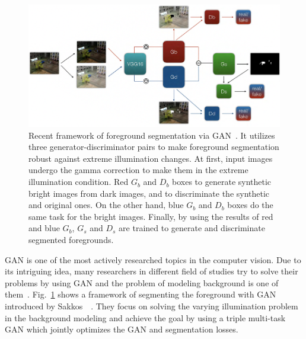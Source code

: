 \documentclass[11pt]{hyu_thesis}
\begin{document}
\begin{figure}
	\centering
	\includegraphics[width=\linewidth]{bg_gan.png}
	\caption{Recent framework of foreground segmentation via GAN~\cite{Sakkos2019}. It utilizes three generator-discriminator pairs to make foreground segmentation robust against extreme illumination changes. At first, input images undergo the gamma correction to make them in the extreme illumination condition. Red $G_b$ and $D_b$ boxes to generate synthetic bright images from dark images, and to discriminate the synthetic and original ones. On the other hand, blue $G_b$ and $D_b$ boxes do the same task for the bright images. Finally, by using the results of red and blue $G_b$, $G_s$ and $D_s$ are trained to generate and discriminate segmented foregrounds.}
	\label{fig:bg_gan}
\end{figure}
GAN is one of the most actively researched topics in the computer vision. Due to its intriguing idea, many researchers in different field of studies try to solve their problems by using GAN and the problem of modeling background is one of them~\cite{Bakkay2018,Sultana2019,Sakkos2019}. Fig.~\ref{fig:bg_gan} shows a framework of segmenting the foreground with GAN introduced by Sakkos~\etal~\cite{Sakkos2019}. They focus on solving the varying illumination problem in the background modeling and achieve the goal by using a triple multi-task GAN which jointly optimizes the GAN and segmentation losses.
\end{document}
